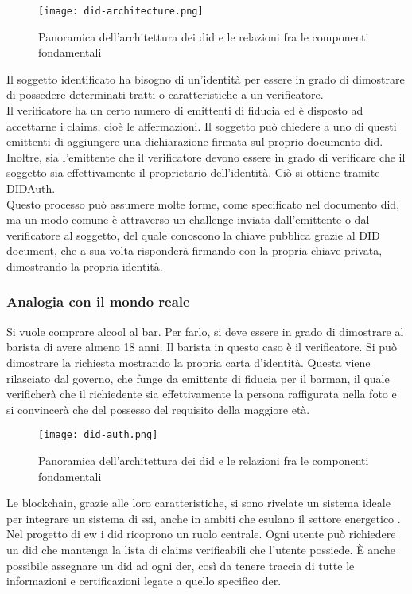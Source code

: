 \begin{figure}[ht]
    \texttt{[image: did-architecture.png]}
    \centering
    \caption{Panoramica dell'architettura dei \gls{did} e le relazioni fra le componenti fondamentali \cite{img:did-architecture}}
    \label{lab:did-architecture}
\end{figure}

Il soggetto identificato ha bisogno di un’identità per essere in grado di dimostrare di possedere determinati tratti o caratteristiche a un verificatore. \\
Il verificatore ha un certo numero di emittenti di fiducia ed è disposto ad accettarne i claims, cioè le affermazioni.
Il soggetto può chiedere a uno di questi emittenti di aggiungere una dichiarazione firmata sul proprio documento \gls{did}.
Inoltre, sia l'emittente che il verificatore devono essere in grado di verificare che il soggetto sia effettivamente il proprietario dell'identità.
Ciò si ottiene tramite DIDAuth. \\
Questo processo può assumere molte forme, come specificato nel documento \gls{did}, ma un modo comune è attraverso un challenge inviata dall'emittente o dal verificatore al soggetto,
del quale conoscono la chiave pubblica grazie al DID document, che a sua volta risponderà firmando con la propria chiave privata, dimostrando la propria identità.

\subsubsection {Analogia con il mondo reale}
Si vuole comprare alcool al bar. Per farlo, si deve essere in grado di dimostrare al barista di avere almeno 18 anni. Il barista in questo caso è il verificatore.
Si può dimostrare la richiesta mostrando la propria carta d'identità.
Questa viene rilasciato dal governo, che funge da emittente di fiducia per il barman,
il quale verificherà che il richiedente sia effettivamente la persona raffigurata nella foto e si convincerà che del possesso del requisito della maggiore età.

\begin{figure}[ht]
    \texttt{[image: did-auth.png]}
    \centering
    \caption{Panoramica dell'architettura dei \gls{did} e le relazioni fra le componenti fondamentali \cite{img:did-auth}}
    \label{lab:did-auth}
\end{figure}

Le blockchain, grazie alle loro caratteristiche, si sono rivelate un sistema ideale per integrare un sistema di \gls{ssi}, anche in ambiti che esulano il settore energetico \cite{art:blockchain-did}. \\
Nel progetto di \gls{ew} i \gls{did} ricoprono un ruolo centrale.
Ogni utente può richiedere un \gls{did} che mantenga la lista di claims verificabili che l'utente possiede.
È anche possibile assegnare un \gls{did} ad ogni \gls{der}, così da tenere traccia di tutte le informazioni e certificazioni legate a quello specifico \gls{der}. \\

